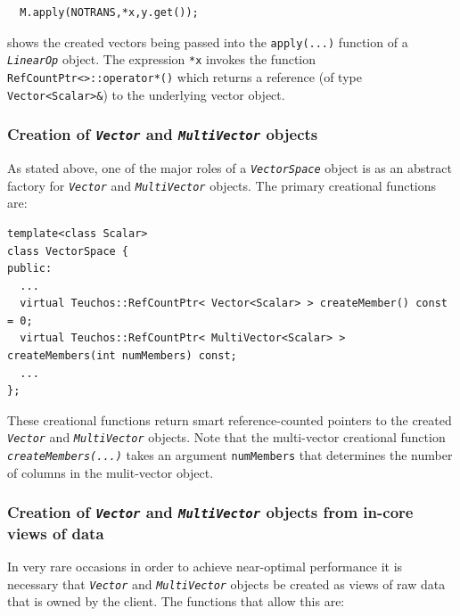{\scriptsize\begin{verbatim}
  M.apply(NOTRANS,*x,y.get());
\end{verbatim}}

{}\noindent{}shows the created vectors being passed into the
{}\texttt{apply(\-...)}  function of a {}\texttt{\textit{LinearOp}}
object.  The expression {}\texttt{*x} invokes the function
{}\texttt{RefCountPtr<>\-::operator*()} which returns a reference (of
type {}\texttt{Vector<Scalar>\&}) to the underlying vector object.

%
\subsubsection{Creation of {}\texttt{\textit{Vector}} and {}\texttt{\textit{Multi\-Vector}} objects}
\label{tsfcore:sec:vec_spc_create}
%

As stated above, one of the major roles of a
{}\texttt{\textit{Vector\-Space}} object is as an abstract factory for
{}\texttt{\textit{Vector}} and {}\texttt{\textit{Multi\-Vector}}
objects.  The primary creational functions are:

{\scriptsize\begin{verbatim}
template<class Scalar>
class VectorSpace {
public:
  ...
  virtual Teuchos::RefCountPtr< Vector<Scalar> > createMember() const = 0;
  virtual Teuchos::RefCountPtr< MultiVector<Scalar> > createMembers(int numMembers) const;
  ...
};
\end{verbatim}}

These creational functions return smart reference-counted pointers to
the created {}\texttt{\textit{Vector}} and
{}\texttt{\textit{Multi\-Vector}} objects.  Note that the multi-vector creational function
{}\texttt{\textit{create\-Members(...)}} takes an argument {}\texttt{num\-Members} that determines
the number of columns in the mulit-vector object.

%
\subsubsection{Creation of {}\texttt{\textit{Vector}} and {}\texttt{\textit{Multi\-Vector}} objects
from in-core views of data}
\label{tsfcore:sec:vec_spc_create_view}
%

In very rare occasions in order to achieve near-optimal performance it
is necessary that {}\texttt{\textit{Vector}} and
{}\texttt{\textit{Multi\-Vector}} objects be created as views of raw
data that is owned by the client.  The functions that allow this are:

